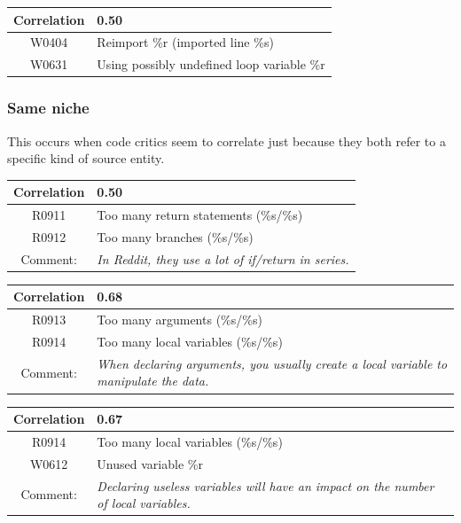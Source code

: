 \documentclass[12pt, a4paper]{article}
\newcommand{\tbf}[1]{\textbf{#1}}
\newcommand{\noi}{\noindent}
\begin{document}
\bigskip \noi
\begin{tabularx}{\textwidth}{|c|X|}
\hline
\tbf{Correlation}   & 0.50 \\
\hline
W0404   & Reimport \%r (imported line \%s) \\
\hline
W0631   & Using possibly undefined loop variable \%r \\
\hline
\end{tabularx}


\subsubsection*{Same niche}
This occurs when code critics seem to correlate just because they both refer to a specific kind of source entity.

\bigskip \noi
\begin{tabularx}{\textwidth}{|c|X|}
\hline
\tbf{Correlation}   & 0.50 \\
\hline
R0911   & Too many return statements (\%s/\%s) \\
\hline
R0912   & Too many branches (\%s/\%s) \\
\hline
Comment: & \textit{In Reddit, they use a lot of if/return in series.}\\
\hline
\end{tabularx}


\bigskip \noi
\begin{tabularx}{\textwidth}{|c|X|}
\hline
\tbf{Correlation}   & 0.68 \\
\hline
R0913   & Too many arguments (\%s/\%s) \\
\hline
R0914   & Too many local variables (\%s/\%s) \\
\hline
Comment: & \textit{When declaring arguments, you usually create a local variable to manipulate the data.}\\
\hline
\end{tabularx}

\bigskip \noi
\begin{tabularx}{\textwidth}{|c|X|}
\hline
\tbf{Correlation}   & 0.67 \\
\hline
R0914   & Too many local variables (\%s/\%s) \\
\hline
W0612   & Unused variable \%r \\
\hline
Comment: & \textit{Declaring useless variables will have an impact on the number of local variables.}\\
\hline
\end{tabularx}
\end{document}
